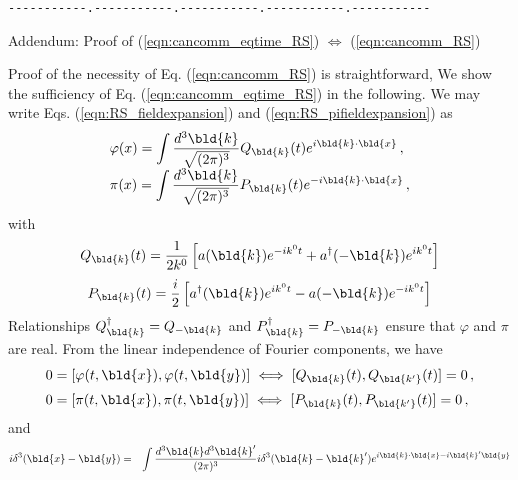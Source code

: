 \verb/-----------.-----------.-----------.-----------.-----------/\\
\vspace{-3mm}
{\small
\begin{center}
Addendum: Proof of (\ref{eqn:cancomm_eqtime_RS}) $\Leftrightarrow$ (\ref{eqn:cancomm_RS})
\end{center}
Proof of the necessity of Eq. (\ref{eqn:cancomm_RS}) is straightforward,
We show the sufficiency
of Eq. (\ref{eqn:cancomm_eqtime_RS}) in the following.
We may write Eqs. (\ref{eqn:RS_fieldexpansion}) and (\ref{eqn:RS_pifieldexpansion})
as
\begin{equation}
\begin{array}{l}
\displaystyle
\varphi(x) = \int \frac{d^3\bld{k}}{\sqrt{(2\pi)^3}} Q_{\bld{k}} (t) e^{i \bld{k} \cdot \bld{x}}\,,
\\
\displaystyle
\pi_{}(x)  = \int \frac{d^3\bld{k}}{\sqrt{(2\pi)^3}} P_{\bld{k}} (t) e^{- i \bld{k} \cdot \bld{x}}\,,
\end{array}
\end{equation}
with
\begin{equation}
Q_{\bld{k}}(t)
=
\frac{1}{2k^0} \left[
a(\bld{k}) e^{-i k^0 t} + a^\dagger(-\bld{k}) e^{i k^0 t} \right]
\label{eqn:RSC_Qk_def}
\end{equation}
\begin{equation}
P_{\bld{k}}(t)
=
\frac{i}{2} \left[
a^\dagger(\bld{k}) e^{i k^0 t} - a(-\bld{k}) e^{- i k^0 t} \right]
\label{eqn:RSC_Pk_def}
\end{equation}
Relationships $Q^\dagger_{\bld{k}} = Q_{-\bld{k}}$ and
$P^\dagger_{\bld{k}} = P_{-\bld{k}}$ ensure 
that $\varphi$ and $\pi$ are real.
From the linear independence of Fourier components, we have
\begin{equation}
\begin{array}{l}
0 = [\varphi(t, \bld{x}), \varphi(t, \bld{y})]
\;\Longleftrightarrow\;
[Q_{\bld{k}}(t), Q_{\bld{k'}}(t)] = 0\,,
\vspace{2mm}
\\
0 = [\pi(t, \bld{x}), \pi(t, \bld{y})]
\;\Longleftrightarrow\;
[P_{\bld{k}}(t), P_{\bld{k'}}(t)] = 0\,,
\end{array}
\label{eqn:RSC_QQcomm}
\end{equation}
and
\begin{eqnarray}
i\delta^3(\bld{x} - \bld{y})
&=&
\int \frac{d^3 \bld{k} d^3 \bld{k}'}{(2\pi)^3}
i \delta^3 (\bld{k} - \bld{k}')
e^{i \bld{k} \cdot \bld{x} - i \bld{k}' \bld{y}}
\nonumber\\

\end{eqnarray}}
